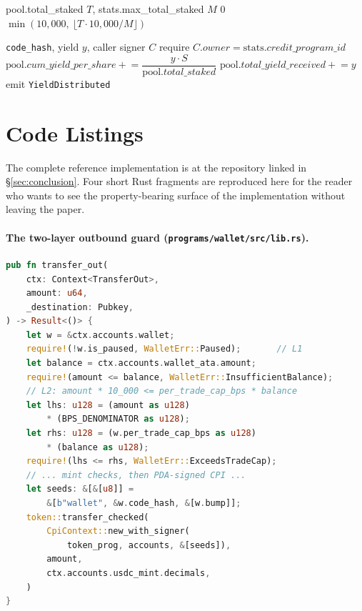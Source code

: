 \documentclass[10pt,conference,letterpaper]{IEEEtran}
\theoremstyle{definition}
\newcommand{\codehash}{\texttt{code\_hash}}
\begin{document}
\begin{algorithm}[H]
\caption{\texttt{compute\_score} (Reputation).}
\label{alg:score}
\begin{algorithmic}[1]
\Require pool.total\_staked $T$, stats.max\_total\_staked $M$
 \Return $0$ \EndIf
\State \Return $\min(10{,}000,\ \lfloor T \cdot 10{,}000 / M \rfloor)$
\end{algorithmic}
\end{algorithm}

\begin{algorithm}[H]
\caption{\texttt{distribute\_voucher\_yield} (Reputation, CPI-only).}
\label{alg:distribute}
\begin{algorithmic}[1]
\Require \codehash, yield $y$, caller signer $C$
\State require $C.\mathit{owner} = \mathrm{stats}.\mathit{credit\_program\_id}$
\State $\mathrm{pool}.\mathit{cum\_yield\_per\_share}\mathrel{+}=
  \dfrac{y\cdot S}{\mathrm{pool}.\mathit{total\_staked}}$
\State $\mathrm{pool}.\mathit{total\_yield\_received}\mathrel{+}= y$
\State emit \texttt{YieldDistributed}
\end{algorithmic}
\end{algorithm}

\section{Code Listings}\label{app:code}

The complete reference implementation is at the repository linked in
\S\ref{sec:conclusion}. Four short Rust fragments are reproduced here
for the reader who wants to see the property-bearing surface of the
implementation without leaving the paper.

\paragraph{The two-layer outbound guard (\texttt{programs/wallet/src/lib.rs}).}

\begin{lstlisting}[language=Rust]
pub fn transfer_out(
    ctx: Context<TransferOut>,
    amount: u64,
    _destination: Pubkey,
) -> Result<()> {
    let w = &ctx.accounts.wallet;
    require!(!w.is_paused, WalletErr::Paused);       // L1
    let balance = ctx.accounts.wallet_ata.amount;
    require!(amount <= balance, WalletErr::InsufficientBalance);
    // L2: amount * 10_000 <= per_trade_cap_bps * balance
    let lhs: u128 = (amount as u128)
        * (BPS_DENOMINATOR as u128);
    let rhs: u128 = (w.per_trade_cap_bps as u128)
        * (balance as u128);
    require!(lhs <= rhs, WalletErr::ExceedsTradeCap);
    // ... mint checks, then PDA-signed CPI ...
    let seeds: &[&[u8]] =
        &[b"wallet", &w.code_hash, &[w.bump]];
    token::transfer_checked(
        CpiContext::new_with_signer(
            token_prog, accounts, &[seeds]),
        amount,
        ctx.accounts.usdc_mint.decimals,
    )
}
\end{lstlisting}
\end{document}
